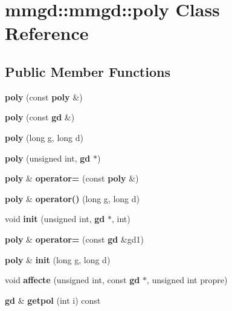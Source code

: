 \section{mmgd\+:\+:mmgd\+:\+:poly Class Reference}
\label{classmmgd_1_1mmgd_1_1poly}
\subsection*{Public Member Functions}
\begin{DoxyCompactItemize}
\item 
\mbox{\label{classmmgd_1_1mmgd_1_1poly_aeda6ade4af424598ef30767c990a6dea}} 
{\bfseries poly} (const \textbf{ poly} \&)
\item 
\mbox{\label{classmmgd_1_1mmgd_1_1poly_ad382086366b79f689dbd7928ecdfdbb5}} 
{\bfseries poly} (const \textbf{ gd} \&)
\item 
\mbox{\label{classmmgd_1_1mmgd_1_1poly_a133a3b2591c6b3a15a4d4fe03ef3599c}} 
{\bfseries poly} (long g, long d)
\item 
\mbox{\label{classmmgd_1_1mmgd_1_1poly_a06487929da588e96a1f63503bad5cd9d}} 
{\bfseries poly} (unsigned int, \textbf{ gd} $\ast$)
\item 
\mbox{\label{classmmgd_1_1mmgd_1_1poly_ac9ae9acd1a5d97c73856ff68aaa8f509}} 
\textbf{ poly} \& {\bfseries operator=} (const \textbf{ poly} \&)
\item 
\mbox{\label{classmmgd_1_1mmgd_1_1poly_a593698e5f78e7aa64a143c85c35333f9}} 
\textbf{ poly} \& {\bfseries operator()} (long g, long d)
\item 
\mbox{\label{classmmgd_1_1mmgd_1_1poly_a5d092e747d276a8f38461a0b7d459759}} 
void {\bfseries init} (unsigned int, \textbf{ gd} $\ast$, int)
\item 
\mbox{\label{classmmgd_1_1mmgd_1_1poly_aec0dc14f9919d62e2223afb9844d1f08}} 
\textbf{ poly} \& {\bfseries operator=} (const \textbf{ gd} \&gd1)
\item 
\mbox{\label{classmmgd_1_1mmgd_1_1poly_a5bd23732151750b7e29789f6e17b9f6b}} 
\textbf{ poly} \& {\bfseries init} (long g, long d)
\item 
\mbox{\label{classmmgd_1_1mmgd_1_1poly_ad8b13c9086778f9461ae8460ecca0d28}} 
void {\bfseries affecte} (unsigned int, const \textbf{ gd} $\ast$, unsigned int propre)
\item 
\mbox{\label{classmmgd_1_1mmgd_1_1poly_ae0b3634dd97dd3512b71b10efcbe28b5}} 
\textbf{ gd} \& {\bfseries getpol} (int i) const
\item 
\mbox{\label{classmmgd_1_1mmgd_1_1poly_a426ca1d32672f822a8ab4fad4fa686f1}} 

\end{DoxyCompactItemize}
